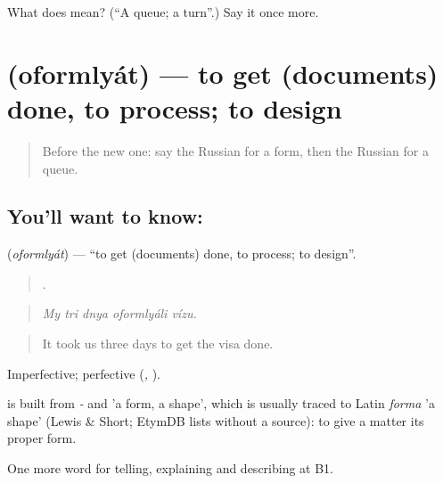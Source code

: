 \begin{tcolorbox}[breakable,colback=teal!4,colframe=teal!35!black,title={Before you move on}]
What does  mean? (\textquotedblleft{}A queue; a turn\textquotedblright{}.) Say it once more.
\end{tcolorbox}
\section[\texorpdfstring{\ru{оформлять} (oformlyát)}{оформлять (oformlyát)}]{ (oformlyát) — to get (documents) done, to process; to design}

\label{lesson:RU-C450-oformlyat}



\begin{quote}
Before the new one: say the Russian for a form, then the Russian for a queue.
\end{quote}

\subsection*{You'll want to know: }
\textbf{} (\emph{oformlyát}) — \textquotedblleft{}to get (documents) done, to process; to design\textquotedblright{}.

\begin{quote}
    .
\end{quote}

\begin{quote}
\emph{My tri dnya oformlyáli vízu.}
\end{quote}

\begin{quote}
It took us three days to get the visa done.
\end{quote}

Imperfective; perfective \emph{} (\emph{, }).

\begin{cousinweb}
\emph{} is built from \emph{-} and \emph{} 'a form, a shape', which is usually traced to Latin \emph{forma} 'a shape' (Lewis \& Short; EtymDB lists \emph{} without a source): to give a matter its proper form.
\end{cousinweb}

\begin{grammarlens}[title={What you've built}]
One more word for telling, explaining and describing at B1.
\end{grammarlens}

